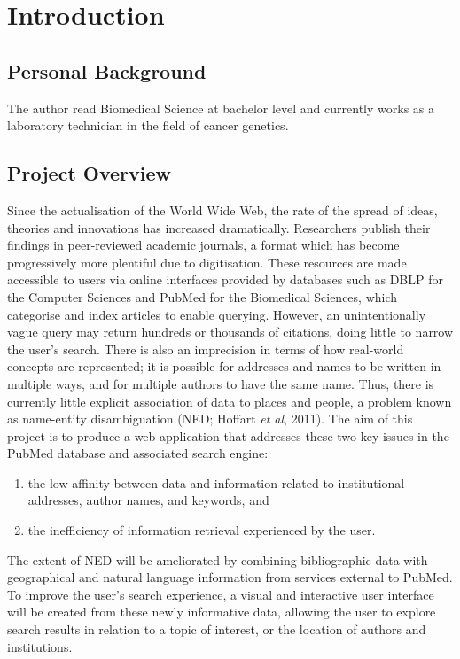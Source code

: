 \documentclass[PROP_AGutteridge_CS.tex]{subfiles}
\begin{document}
\chapter{Introduction}
\section{Personal Background}
The author read Biomedical Science at bachelor level and currently works as a laboratory technician in the field of cancer genetics.

\section{Project Overview}
Since the actualisation of the World Wide Web, the rate of the spread of ideas, theories and innovations has increased dramatically. Researchers publish their findings in peer-reviewed academic journals, a format which has become progressively more plentiful due to digitisation. These resources are made accessible to users via online interfaces provided by databases such as DBLP for the Computer Sciences and PubMed for the Biomedical Sciences, which categorise and index articles to enable querying. However, an unintentionally vague query may return hundreds or thousands of citations, doing little to narrow the user's search. There is also an imprecision in terms of how real-world concepts are represented; it is possible for addresses and names to be written in multiple ways, and for multiple authors to have the same name. Thus, there is currently little explicit association of data to places and people, a problem known as name-entity disambiguation (NED; Hoffart \emph{et al}, 2011). The aim of this project is to produce a web application that addresses these two key issues in the PubMed database and associated search engine:\\
\begin{enumerate}
\item the low affinity between data and information related to institutional addresses, author names, and keywords, and
\item the inefficiency of information retrieval experienced by the user.
\end{enumerate}
The extent of NED will be ameliorated by combining bibliographic data with geographical and natural language information from services external to PubMed. To improve the user's search experience, a visual and interactive user interface will be created from these newly informative data, allowing the user to explore search results in relation to a topic of interest, or the location of authors and institutions. 
\end{document}
